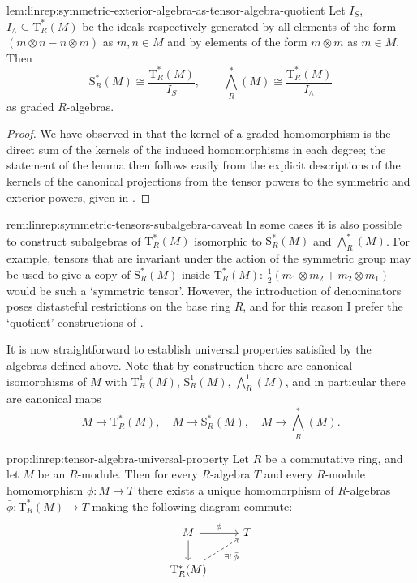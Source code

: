 \begin{lem}{}{lem:linrep:symmetric-exterior-algebra-as-tensor-algebra-quotient}
  Let $I_S$, $I_\wedge \subseteq \mathrm{T}^*_R(M)$ be the ideals
  respectively generated by all elements of the form
  $(m \otimes n - n \otimes m)$ as $m, n \in M$ and by elements of the
  form $m \otimes m$ as $m \in M$. Then
  \[
    \mathrm{S}^*_R(M) \cong \frac{\mathrm{T}^*_R(M)}{I_S}, \qquad
    \bigwedge^*_R(M) \cong \frac{\mathrm{T}^*_R(M)}{I_\wedge}
  \]
  as graded $R$-algebras.
\end{lem}
\begin{proof}
  We have observed in
   that the
  kernel of a graded homomorphism is the direct sum of the kernels of
  the induced homomorphisms in each degree; the statement of the lemma
  then follows easily from the explicit descriptions of the kernels of
  the canonical projections from the tensor powers to the symmetric
  and exterior powers, given in
  .
\end{proof}
\begin{rem}{}{rem:linrep:symmetric-tensors-subalgebra-caveat}
  In some cases it is also possible to construct subalgebras of
  $\mathrm{T}^*_R(M)$ isomorphic to $\mathrm{S}^*_R(M)$ and
  $\bigwedge^*_R(M)$. For example, tensors that are invariant under
  the action of the symmetric group may be used to give a copy of
  $\mathrm{S}^*_R(M)$ inside $\mathrm{T}^*_R(M)$:
  $\frac{1}{2}(m_1 \otimes m_2 + m_2 \otimes m_1)$ would be such a
  `symmetric tensor'. However, the introduction of denominators poses
  distasteful restrictions on the base ring $R$, and for this reason I
  prefer the `quotient' constructions of .
\end{rem}
It is now straightforward to establish universal properties satisfied
by the algebras defined above. Note that by construction there are
canonical isomorphisms of $M$ with $\mathrm{T}^1_R(M)$,
$\mathrm{S}^1_R(M)$, $\bigwedge^1_R(M)$, and in particular there are
canonical maps
\[
  M \to \mathrm{T}^*_R(M), \quad M \to \mathrm{S}^*_R(M), \quad M \to
  \bigwedge^*_R(M).
\]

\begin{prop}{}{prop:linrep:tensor-algebra-universal-property}
  Let $R$ be a commutative ring, and let $M$ be an $R$-module. Then
  for every $R$-algebra $T$ and every $R$-module homomorphism
  $\phi : M \to T$ there exists a unique homomorphism of $R$-algebras
  $\bar\phi : \mathrm{T}^*_R(M) \to T$ making the following diagram
  commute:
  \[
    \begin{tikzcd}
      M \ar[r, "\phi"] \ar[d] & T \\
      \mathrm{T}^*_R(M) \ar[ur, dashed, "\exists!\,\bar\phi"']
    \end{tikzcd}
  \]
\end{prop}

